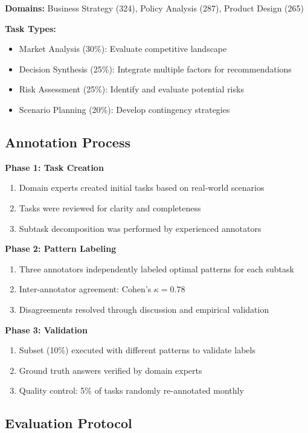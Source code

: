 \documentclass{article}
\theoremstyle{plain}
\theoremstyle{definition}
\theoremstyle{remark}
\begin{document}
\textbf{Domains:} Business Strategy (324), Policy Analysis (287), Product Design (265)

\textbf{Task Types:}
\begin{itemize}[nosep]
	\item Market Analysis (30\%): Evaluate competitive landscape
	\item Decision Synthesis (25\%): Integrate multiple factors for recommendations
	\item Risk Assessment (25\%): Identify and evaluate potential risks
	\item Scenario Planning (20\%): Develop contingency strategies
\end{itemize}

\subsection{Annotation Process}
\label{sub:ann}

\textbf{Phase 1: Task Creation}
\begin{enumerate}[nosep]
	\item Domain experts created initial tasks based on real-world scenarios
	\item Tasks were reviewed for clarity and completeness
	\item Subtask decomposition was performed by experienced annotators
\end{enumerate}

\textbf{Phase 2: Pattern Labeling}
\begin{enumerate}[nosep]
	\item Three annotators independently labeled optimal patterns for each subtask
	\item Inter-annotator agreement: Cohen's $\kappa = 0.78$
	\item Disagreements resolved through discussion and empirical validation
\end{enumerate}

\textbf{Phase 3: Validation}
\begin{enumerate}[nosep]
	\item Subset (10\%) executed with different patterns to validate labels
	\item Ground truth answers verified by domain experts
	\item Quality control: 5\% of tasks randomly re-annotated monthly
\end{enumerate}

\subsection{Evaluation Protocol}
\end{document}
